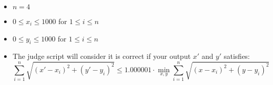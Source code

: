 \begin{itemize}
	\tightlist
	\item $n = 4$
	\item $0 \le x_i \le 1000$ for $1\le i \le n$
	\item $0 \le y_i \le 1000$ for $1\le i \le n$
	\item The judge script will consider it is correct if your output $x'$ and $y'$ satisfies: $$\sum_{i=1}^{n}\sqrt{(x'-x_i)^2+(y'-y_i)^2}\le 1.000001\cdot\min_{x,y}\sum_{i=1}^{n}\sqrt{(x-x_i)^2+(y-y_i)^2}$$
\end{itemize}

